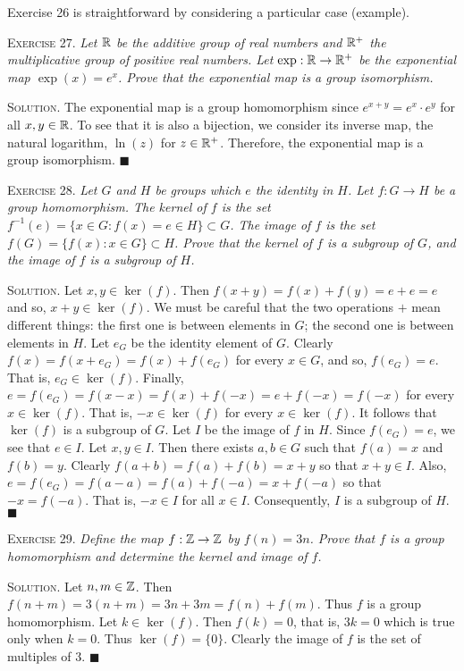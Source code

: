 \documentclass[11pt, leqno]{article}
\newcommand{\done}{\ensuremath{\blacksquare}}
\begin{document}
Exercise 26 is straightforward by considering a particular case (example).

\textsc{Exercise 27}. \emph{Let $\mathbb{R}$ be the additive group of real numbers and $\mathbb{R}^+$ the multiplicative group of positive real numbers. Let $\exp: \mathbb{R} \to \mathbb{R}^+$ be the exponential map $\exp(x) = e^x$. Prove that the exponential map is a group isomorphism.}

\textsc{Solution}. The exponential map is a group homomorphism since $e^{x+y}=e^x\cdot e^y$ for all $x,y \in \mathbb{R}$. To see that it is also a bijection, we consider its inverse map, the natural logarithm, $\ln(z)$ for $z\in\mathbb{R}^+$. Therefore, the exponential map is a group isomorphism. \done

\textsc{Exercise 28}. \emph{Let $G$ and $H$ be groups which $e$ the identity in $H$. Let $f:G\to H$ be a group homomorphism. The kernel of $f$ is the set $f^{-1}(e) = \{x\in G : f(x) = e \in H \} \subset G$. The image of $f$ is the set $f(G) = \{f(x) : x\in G\} \subset H$. Prove that the kernel of $f$ is a subgroup of $G$, and the image of $f$ is a subgroup of $H$.}

\textsc{Solution}. Let $x,y\in \ker(f)$. Then $f(x+y) = f(x) + f(y) = e + e = e$ and so, $x+y \in \ker(f)$. We must be careful that the two operations $+$ mean different things: the first one is between elements in $G$; the second one is between elements in $H$. Let $e_G$ be the identity element of $G$. Clearly $f(x) = f(x + e_G) = f(x) + f(e_G)$ for every $x \in G$, and so, $f(e_G) = e$. That is, $e_G \in \ker(f)$. Finally, $e = f(e_G) = f(x - x) = f(x) + f(-x) = e + f(-x) = f(-x)$ for every $x\in \ker(f)$. That is, $-x\in \ker(f)$ for every $x\in \ker(f)$. It follows that $\ker(f)$ is a subgroup of $G$. Let $I$ be the image of $f$ in $H$. Since $f(e_G) = e$, we see that $e\in I$. Let $x, y \in I$. Then there exists $a, b \in G$ such that $f(a) = x$ and $f(b) = y$. Clearly $f(a + b) = f(a) + f(b) = x + y$ so that $x+y \in I$. Also, $e = f(e_G) = f(a - a) = f(a) + f(-a) = x + f(-a)$ so that $-x = f(-a)$. That is, $-x \in I$ for all $x\in I$. Consequently, $I$ is a subgroup of $H$. \done

\textsc{Exercise 29}. \emph{Define the map $f: \mathbb{Z} \to \mathbb{Z}$ by $f(n)=3n$. Prove that $f$ is a group homomorphism and determine the kernel and image of $f$.}

\textsc{Solution}. Let $n,m \in \mathbb{Z}$. Then $f(n+m) = 3(n+m) = 3n + 3m = f(n) + f(m)$. Thus $f$ is a group homomorphism. Let $k\in \ker(f)$. Then $f(k) = 0$, that is, $3k = 0$ which is true only when $k=0$. Thus $\ker(f) = \{0\}$. Clearly the image of $f$ is the set of multiples of $3$. \done
\end{document}

